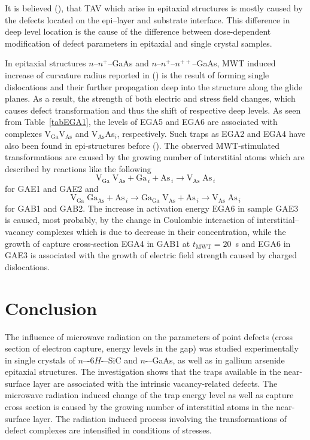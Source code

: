 \documentclass[final,3p,times,twocolumn,authoryear]{elsarticle}
\begin{document}
It is believed (\cite{OstrovskiiSST,OlikhSSC,OstrovPAN}), that TAV 
which arise in epitaxial structures
is mostly caused by the defects located on the epi--layer and substrate interface.
This difference in deep level location
is the cause of the difference between dose-dependent modification of defect parameters in epitaxial and single crystal samples.

In epitaxial structures $n$--$n^+$--GaAs and $n$--$n^+$--$n^{++}$--GaAs,
MWT induced increase of curvature radius reported in (\cite{BoltovetsEn,Konakova2012FTPEn})
is the result of forming single dislocations and their further propagation deep into the structure along the glide planes.
As a result, the strength of both electric and stress field changes,
which causes defect transformation and thus the shift of respective deep levels.
As seen from Table~\ref{tabEGA1}, the levels of EGA5 and EGA6 are associated with complexes   V$_\mathrm{Ga}$V$_\mathrm{As}$  and V$_\mathrm{As}$As$_i$, respectively.
Such traps as EGA2 and EGA4 have also been found in epi-structures before (\cite{Yousefi1995,Mircea1975,Bourgoin:GaAs,ASHBY:GaAs,Fang:EL6,Lefevre1977,KolFTP1989En}).
The observed MWT-stimulated transformations are caused by the growing number of interstitial atoms which are described by reactions like the following
\begin{displaymath}
  \mathrm{V}_\mathrm{Ga}\;\mathrm{V}_\mathrm{As}+\mathrm{Ga}_{\,i}+\mathrm{As}_{\,i} \rightarrow \mathrm{V}_\mathrm{As}\;\mathrm{As}_{\,i}
\end{displaymath}
for GAE1 and GAE2 and
\begin{displaymath}
  \mathrm{V}_\mathrm{Ga}\;\mathrm{Ga}_\mathrm{As}+\mathrm{As}_{\,i} \rightarrow
  \mathrm{Ga}_\mathrm{Ga}\;\mathrm{V}_\mathrm{As}+\mathrm{As}_{\,i} \rightarrow
  \mathrm{V}_\mathrm{As}\;\mathrm{As}_{\,i}
\end{displaymath}
for GAB1 and GAB2.
The increase in activation energy EGA6 in sample GAE3 is caused, most probably, by the change in
Coulombic interaction of interstitial--vacancy complexes 
which is due to decrease in their concentration,
while the growth of capture cross-section EGA4 in GAB1 at $t_\mathrm{MWT}=20$~s
and EGA6 in GAE3 is associated with the growth of electric field strength caused by charged dislocations.

\section{Conclusion}
The influence of microwave radiation on the parameters of point defects (cross section of electron capture, energy levels in the gap)
was studied experimentally  in single crystals of $n$–-6$H$-–SiC and  $n$-–GaAs, as well as in gallium arsenide epitaxial structures.
The investigation shows that the traps available in the near-surface layer are associated with the intrinsic
vacancy-related defects.
The microwave radiation induced change of the trap energy level as well as capture cross section
is caused by the growing number of interstitial atoms in the near-surface layer.
The  radiation induced process involving the transformations of defect complexes are intensified in conditions of stresses.
\end{document}

